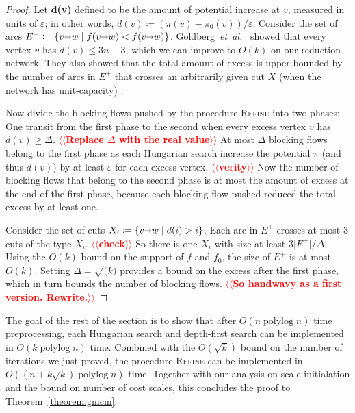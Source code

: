 \documentclass[11pt]{article}
\makeatletter
\def\etal{\textit{et~al.}}
\def\polylog{\mathop{\mathrm{polylog}}}
\def\eps{\varepsilon}
\def\abs#1{\mathopen| #1 \mathclose|}		%
\def\Set#1{\left\{ #1 \right\}}
\def\arcto{\mathord\shortrightarrow}
\def\arc#1#2{#1\arcto#2}
\theoremstyle{plain}
\numberwithin{figure}{section}
\def\EMPH#1{\textbf{\boldmath #1}}
\def\n@te#1{\textsf{\boldmath \textbf{$\langle\!\langle$#1$\rangle\!\rangle$}}\leavevmode}
\def\note#1{\textcolor{red}{\n@te{#1}}}
\makeatother
\begin{document}
\begin{proof}
Let \EMPH{d(v)} defined to be the amount of potential increase at $v$, measured in units of $\eps$; in other words, $d(v) \coloneqq (\pi(v) - \pi_0(v)) / \eps$.
Consider the set of arcs $\EMPH{$E^+$} \coloneqq \Set{\arc vw \mid f(\arc vw) < f(\arc vw)}$.
%
Goldberg~\etal~\cite{GHKT17} showed that every vertex $v$ has $d(v) \le 3n-3$, which we can improve to $O(k)$ on our reduction network.
They also showed that the total amount of excess is upper bounded by the number of arcs in $E^+$ that crosses an arbitrarily given cut $X$ (when the network has unit-capacity) \cite[Lemma~3.6]{GHKT17}.

Now divide the blocking flows pushed by the procedure \textsc{Refine} into two phases: One transit from the first phase to the second when every excess vertex $v$ has $d(v) \ge \Delta$. \note{Replace $\Delta$ with the real value}
%
At most $\Delta$ blocking flows belong to the first phase as each Hungarian search increase the potential $\pi$ (and thus $d(v)$) by at least $\eps$ for each excess vertex. \note{verity}
Now the number of blocking flows that belong to the second phase is at most the amount of excess at the end of the first phase, because each blocking flow pushed reduced the total excess by at least one.

Consider the set of cuts $X_i \coloneqq \Set{\arc vw \mid d(i) > i}$.  Each arc in $E^+$ crosses at most $3$ cuts of the type $X_i$. \note{check}  So there is one $X_i$ with size at least $3\abs{E^+}/\Delta$.
Using the $O(k)$ bound on the support of $f$ and $f_0$, the size of $E^+$ is at most $O(k)$.  Setting $\Delta = \sqrt(k)$ provides a bound on the excess after the first phase, which in turn bounds the number of blocking flows.
\note{So handwavy as a first version.  Rewrite.}
\end{proof}


The goal of the rest of the section is to show that after $O(n \polylog n)$ time preprocessing, each Hungarian search and depth-first search can be implemented in $O(k \polylog n)$ time.
%
Combined with the $O(\sqrt{k})$ bound on the number of iterations we just proved, the procedure \textsc{Refine} can be implemented in $O((n+k\sqrt{k}) \polylog n)$ time.  Together with our analysis on scale initialation and the bound on number of cost scales, this concludes the proof to Theorem~\ref{theorem:gmcm}.
\end{document}
